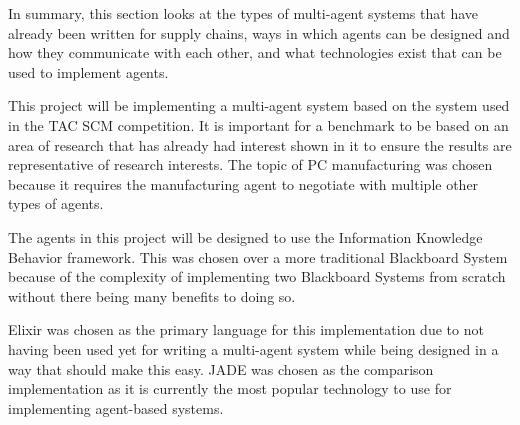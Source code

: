 In summary, this section looks at the types of multi-agent systems that have already been written for supply chains, ways in which agents can be designed and how they communicate with each other, and what technologies exist that can be used to implement agents.

This project will be implementing a multi-agent system based on the system used in the TAC SCM competition.
It is important for a benchmark to be based on an area of research that has already had interest shown in it to ensure the results are representative of research interests.
The topic of PC manufacturing was chosen because it requires the manufacturing agent to negotiate with multiple other types of agents.

The agents in this project will be designed to use the Information Knowledge Behavior framework.
This was chosen over a more traditional Blackboard System because of the complexity of implementing two Blackboard Systems from scratch without there being many benefits to doing so.

Elixir was chosen as the primary language for this implementation due to not having been used yet for writing a multi-agent system while being designed in a way that should make this easy.
JADE was chosen as the comparison implementation as it is currently the most popular technology to use for implementing agent-based systems.

